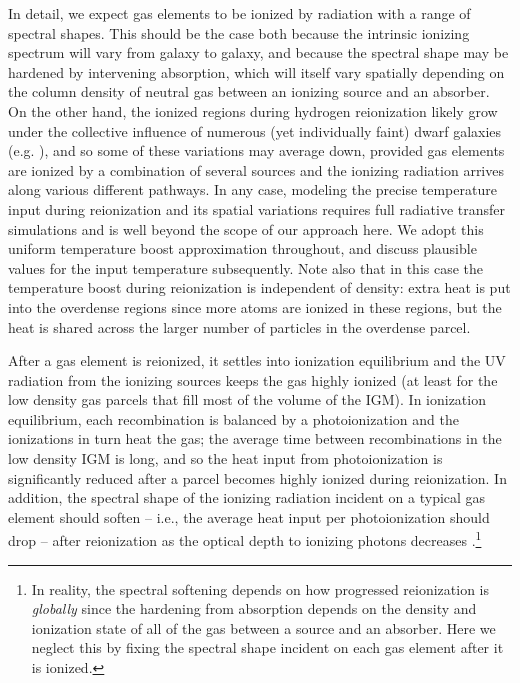 In detail, we expect gas elements to be ionized by radiation with a range of spectral shapes. This should be the case both
because the intrinsic ionizing spectrum will vary from galaxy to galaxy, and because
the spectral shape may be hardened by intervening absorption, which will itself vary spatially depending on the column density
of neutral gas between an ionizing source and an absorber. On the other hand, the ionized regions during hydrogen reionization
likely grow under the collective influence of numerous (yet individually faint) dwarf galaxies (e.g. \citealt{Robertson:2013bq}), and so
some of these variations may average down, provided gas elements are ionized by a combination of several sources and
the ionizing radiation arrives along various different pathways.
In any case, modeling the precise temperature input during reionization and its spatial variations requires full radiative
transfer simulations and is well beyond the scope of our approach here.
We adopt this uniform temperature boost approximation throughout, and discuss plausible values for the input temperature subsequently. Note also that in this case
the temperature boost during reionization is 
independent of density: extra heat is put into the overdense regions since more
atoms are ionized in these regions, but the heat is shared across the larger number of particles in the overdense parcel.

After a gas element is reionized, it settles into ionization equilibrium and the
UV radiation from the ionizing sources keeps the gas highly ionized (at least for the low density gas parcels that fill most
of the volume of the IGM). 
In ionization equilibrium, each recombination is balanced by a photoionization and the ionizations in turn heat
the gas; the average time between recombinations in the low density IGM is long, and so the heat input from photoionization
is significantly reduced after a parcel becomes highly ionized during reionization. In 
addition, the spectral shape of the ionizing radiation incident on
a typical gas element should soften -- i.e., the average heat input per photoionization should drop -- after reionization as the optical depth to ionizing photons decreases \citep{Abel:1999vj}.\footnote{In reality, the spectral
softening depends on how progressed reionization is {\em globally} since the hardening from absorption depends on the 
density and ionization
state of all of the gas between a source and an absorber. Here we neglect this by fixing the spectral shape incident on each
gas element after it is ionized.}

